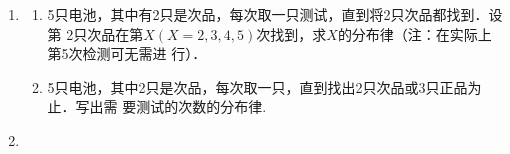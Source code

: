 \documentclass[10pt,a4paper]{article}
\begin{document}
\begin{enumerate}
    \item \begin{enumerate}
        \item 5只电池，其中有2只是次品，每次取一只测试，直到将2只次品都找到．设第
        2只次品在第$X(X=2,3,4,5)$次找到，求$X$的分布律（注：在实际上第5次检测可无需进
        行）．
        \item 5只电池，其中2只是次品，每次取一只，直到找出2只次品或3只正品为止．写出需
        要测试的次数的分布律.
    \end{enumerate}



    \item 


    


    

    

  

\end{enumerate}
\end{document}

